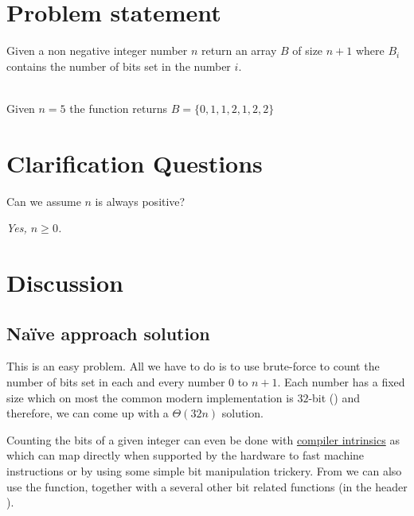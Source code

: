 \section{Problem statement}
\begin{exercise}
\label{example:count_bits:exercice1}
Given a non negative integer number $n$ return an array $B$ of size $n+1$ where $B_i$ contains the
number of bits set in the number $i$.
	\begin{example}
		\label{example:count_bits:example1}
		\hfill \\
		Given $n = 5$ the function returns $B = \{0,1,1,2,1,2,2\}$	
	\end{example}

\end{exercise}

\section{Clarification Questions}

\begin{QandA}
	\begin{questionitem} \begin{question} Can we assume $n$ is always positive?  \end{question} 	 
    \begin{answered}
		\textit{Yes, $n \geq 0$.}
	\end{answered} \end{questionitem}
	
\end{QandA}

\section*{Discussion}
\label{count_bits:sec:discussion}


\subsection{Na\"ive approach solution}
\label{count_bits:sec:bruteforce}
This is an easy problem. All we have to do is to use brute-force to count the number of bits set in each and every number $0$ to $n+1$. 
Each number has a fixed size which on most the common modern \CC implementation is $32$-bit () and therefore,
we can come up with a $\Theta(32n)$ solution. 

Counting the bits of a given integer can even be done
with
\href{https://gcc.gnu.org/onlinedocs/gcc-4.9.2/gcc/X86-Built-in-Functions.html}{compiler intrinsics}
as  which can map directly when supported by the hardware to fast
machine instructions or by using some simple bit manipulation trickery. 
From  we can also use
the  function, together with a several other  bit related functions (in the
header ). 

